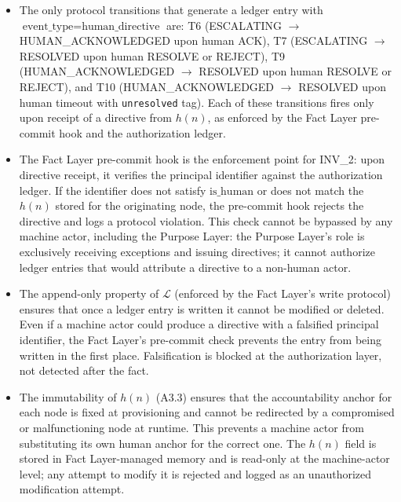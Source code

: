 \begin{itemize}
\item[\textbf{Step 1.}] The only protocol transitions that generate a ledger entry with $\text{event\_type} = \text{human\_directive}$ are: T6 (ESCALATING $\rightarrow$ HUMAN\_ACKNOWLEDGED upon human ACK), T7 (ESCALATING $\rightarrow$ RESOLVED upon human RESOLVE or REJECT), T9 (HUMAN\_ACKNOWLEDGED $\rightarrow$ RESOLVED upon human RESOLVE or REJECT), and T10 (HUMAN\_ACKNOWLEDGED $\rightarrow$ RESOLVED upon human timeout with \texttt{unresolved} tag). Each of these transitions fires only upon receipt of a directive from $h(n)$, as enforced by the Fact Layer pre-commit hook and the authorization ledger.

\item[\textbf{Step 2.}] The Fact Layer pre-commit hook is the enforcement point for INV\_2: upon directive receipt, it verifies the principal identifier against the authorization ledger. If the identifier does not satisfy $\text{is\_human}$ or does not match the $h(n)$ stored for the originating node, the pre-commit hook rejects the directive and logs a protocol violation. This check cannot be bypassed by any machine actor, including the Purpose Layer: the Purpose Layer's role is exclusively receiving exceptions and issuing directives; it cannot authorize ledger entries that would attribute a directive to a non-human actor.

\item[\textbf{Step 3.}] The append-only property of $\mathcal{L}$ (enforced by the Fact Layer's write protocol) ensures that once a ledger entry is written it cannot be modified or deleted. Even if a machine actor could produce a directive with a falsified principal identifier, the Fact Layer's pre-commit check prevents the entry from being written in the first place. Falsification is blocked at the authorization layer, not detected after the fact.

\item[\textbf{Step 4.}] The immutability of $h(n)$ (A3.3) ensures that the accountability anchor for each node is fixed at provisioning and cannot be redirected by a compromised or malfunctioning node at runtime. This prevents a machine actor from substituting its own human anchor for the correct one. The $h(n)$ field is stored in Fact Layer-managed memory and is read-only at the machine-actor level; any attempt to modify it is rejected and logged as an unauthorized modification attempt.
\end{itemize}

